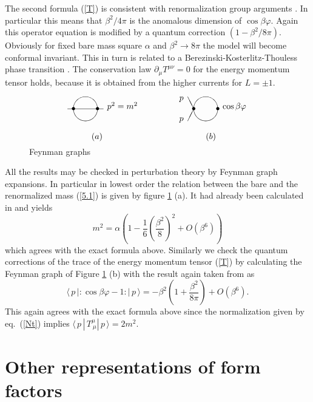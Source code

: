 \documentclass[a4paper,a4paper]{article}
\begin{document}
The second formula (\ref{T}) is consistent with renormalization group
arguments \cite{Z,Ca}. In particular this means that $\beta ^{2}/4\pi $ is
the anomalous dimension of $\cos \beta \varphi $. Again this operator
equation is modified by a quantum correction $(1-\beta ^{2}/8\pi )$.
Obviously for fixed bare mass square $\alpha $ and $\beta ^{2}\rightarrow
8\pi $ the model will become conformal invariant. This in turn is related to
a Berezinski-Kosterlitz-Thouless phase transition \cite{KT,JKKN,Wi}. The
conservation law $\partial _{\mu }T^{\mu \nu }=0$ for the energy momentum
tensor holds, because it is obtained from the higher currents for $L=\pm 1$. 
\begin{figure}[tbh]
\[
\begin{array}{l}
\unitlength5mm \begin{picture}(14,3) \put(1,2){\oval(2,2)}
\put(0,2){\makebox(0,0){$\bullet$}} \put(2,2){\makebox(0,0){$\bullet$}}
\put(-.5,2){\line(1,0){3}} \put(2.8,2){$p^2=m^2$} \put(1.5,-.5){$(a)$}
\put(11,2){\oval(2,2)} \put(10,2){\makebox(0,0){$\bullet$}}
\put(12,2){\makebox(0,0){$\bullet$}} \put(12.4,2){$\cos \beta \varphi$}
\put(10,2){\line(-1,2){.5}} \put(10,2){\line(-1,-2){.5}} \put(8.8,1){$p$}
\put(8.8,2.7){$p$} \put(11,-.5){$(b)$} \end{picture}
\end{array}
\]
\caption{Feynman graphs}
\label{f8}
\end{figure}
All the results may be checked in perturbation theory by Feynman graph
expansions. In particular in lowest order the relation between the bare and
the renormalized mass (\ref{5.1}) is given by figure \ref{f8} (a). It had
already been calculated in \cite{KW} and yields 
\[
m^{2}=\alpha \left( 1-\frac{1}{6}\left( \frac{\beta ^{2}}{8}\right)
^{2}+O(\beta ^{6})\right) 
\]
which agrees with the exact formula above. Similarly we check the quantum
corrections of the trace of the energy momentum tensor (\ref{T}) by
calculating the Feynman graph of Figure \ref{f8} (b) with the result again
taken from \cite{KW} as 
\[
\langle \,p\,|\!:\!\cos \beta \varphi -1\!:\!|\,p\,\rangle =-\beta
^{2}\left( 1+\frac{\beta ^{2}}{8\pi }\right) +O(\beta ^{6}). 
\]
This again agrees with the exact formula above since the normalization given
by eq.~(\ref{Nt}) implies $\langle \,p\,|\,T_{~\mu }^{\mu }|\,p\,\rangle
=2m^{2}$.

\section{Other representations of form factors\label{s6}}
\end{document}
